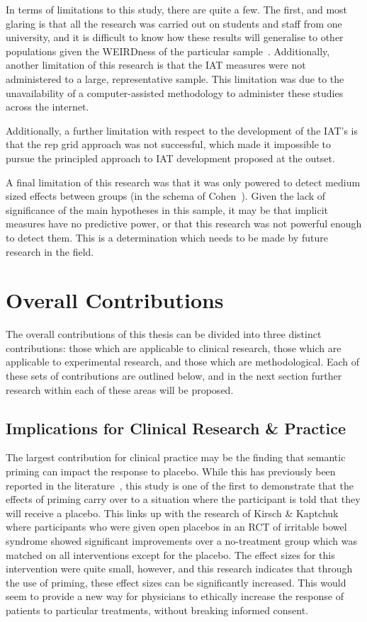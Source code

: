 In terms of limitations to this study, there are quite a few. The
first, and most glaring is that all the research was carried out on
students and staff from one university, and it is difficult to know
how these results will generalise to other populations given the
WEIRDness of the particular sample~\cite{henrich2010most}.
Additionally, another limitation of this research is that the IAT
measures were not administered to a large, representative sample. This
limitation was due to the unavailability of a computer-assisted
methodology to administer these studies across the internet.

Additionally, a further limitation with respect to the development of
the IAT's is that the rep grid approach was not successful, which made
it impossible to pursue the principled approach to IAT development
proposed at the outset.

A final limitation of this research was that it was only powered to
detect medium sized effects between groups (in the schema of
Cohen~\cite{cohen1988statistical}). Given the lack of significance of
the main hypotheses in this sample, it may be that implicit measures
have no predictive power, or that this research was not powerful
enough to detect them. This is a determination which needs to be made
by future research in the field.


\section{Overall Contributions}
\label{sec:over-contr}

The overall contributions of this thesis can be divided into three
distinct contributions: those which are applicable to clinical
research, those which are applicable to experimental research, and
those which are methodological. Each of these sets of contributions
are outlined below, and in the next section further research within
each of these areas will be proposed.

\subsection{Implications for Clinical Research \& Practice}
\label{sec:impl-clin-rese}

The largest contribution for clinical practice may be the finding that
semantic priming can impact the response to placebo. While this has
previously been reported in the
literature~\cite{Geers2005a,Jensen1991}, this study is one of the
first to demonstrate that the effects of priming carry over to a
situation where the participant is told that they will receive a
placebo. This links up with the research of Kirsch \&
Kaptchuk~\cite{kaptchuk2010placebos} where participants who were given
open placebos in an RCT of irritable bowel syndrome showed significant
improvements over a no-treatment group which was matched on all
interventions except for the placebo. The effect sizes for this
intervention were quite small, however, and this research indicates
that through the use of priming, these effect sizes can be
significantly increased. This would seem to provide a new way for
physicians to ethically increase the response of patients to
particular treatments, without breaking informed consent.

